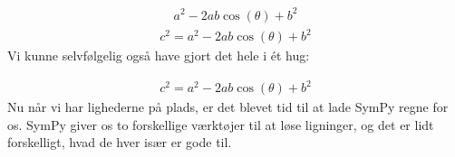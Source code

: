 \documentclass[letterpaper,10pt,english]{jupyterBook}
\begin{document}
\begin{sphinxVerbatim}[commandchars=\\\{\}]
   

       

            
\end{sphinxVerbatim}
\begin{equation*}
\begin{split}\displaystyle a^{2} - 2 a b \cos{\left(\theta \right)} + b^{2}\end{split}
\end{equation*}\begin{equation*}
\begin{split}\displaystyle c^{2} = a^{2} - 2 a b \cos{\left(\theta \right)} + b^{2}\end{split}
\end{equation*}
Vi kunne selvfølgelig også have gjort det hele i ét hug:

\begin{sphinxVerbatim}[commandchars=\\\{\}]
       
\end{sphinxVerbatim}
\begin{equation*}
\begin{split}\displaystyle c^{2} = a^{2} - 2 a b \cos{\left(\theta \right)} + b^{2}\end{split}
\end{equation*}
Nu når vi har lighederne på plads, er det blevet tid til at lade SymPy regne for os. SymPy giver os to forskellige værktøjer til at løse ligninger, og det er lidt forskelligt, hvad de hver især er gode til.
\end{document}
